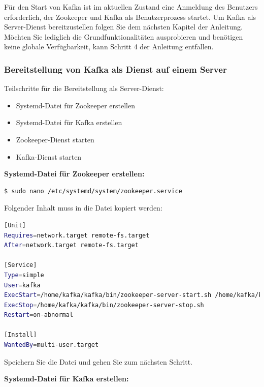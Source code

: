 \documentclass[a4paper,titlepage,halfparskip,12pt]{scrreprt}
\begin{document}
\begin{onehalfspacing}
Für den Start von Kafka ist im aktuellen Zustand eine Anmeldung des Benutzers erforderlich, der Zookeeper und Kafka als Benutzerprozess startet. Um Kafka als Server-Dienst bereitzustellen folgen Sie dem nächsten Kapitel der Anleitung. Möchten Sie lediglich die Grundfunktionalitäten ausprobieren und benötigen keine globale Verfügbarkeit, kann Schritt 4 der Anleitung entfallen.

\subsubsection*{Bereitstellung von Kafka als Dienst auf einem Server}

Teilschritte für die Bereitstellung als Server-Dienst:

\begin{itemize}
\item Systemd-Datei für Zookeeper erstellen
\item Systemd-Datei für Kafka erstellen
\item Zookeeper-Dienst starten
\item Kafka-Dienst starten
\end{itemize}

\bigskip

\textbf{Systemd-Datei für Zookeeper erstellen:}

\bigskip

\begin{lstlisting}[language=Bash]
$ sudo nano /etc/systemd/system/zookeeper.service
\end{lstlisting}

Folgender Inhalt muss in die Datei kopiert werden:

\smallskip

\begin{lstlisting}[language=Bash]
[Unit]
Requires=network.target remote-fs.target
After=network.target remote-fs.target

[Service]
Type=simple
User=kafka
ExecStart=/home/kafka/kafka/bin/zookeeper-server-start.sh /home/kafka/kafka/config/zookeeper.properties
ExecStop=/home/kafka/kafka/bin/zookeeper-server-stop.sh
Restart=on-abnormal

[Install]
WantedBy=multi-user.target
\end{lstlisting}

Speichern Sie die Datei und gehen Sie zum nächsten Schritt.

\textbf{Systemd-Datei für Kafka erstellen:}

\bigskip


\end{onehalfspacing}
\end{document}
